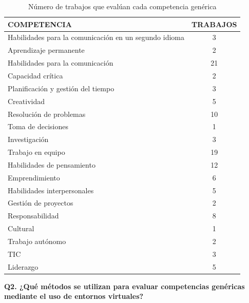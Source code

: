 
\begin{table}
  \begin{center}
  \begin{tabular}{| m{10cm} | c |}
    \hline
    COMPETENCIA & TRABAJOS\\
    \hline
    \hline 
    Habilidades para la comunicación en un segundo idioma & 3\\
    \hline
    Aprendizaje permanente & 2\\
    \hline
    Habilidades para la comunicación & 21\\
    \hline
    Capacidad crítica & 2\\
    \hline
    Planificación y gestión del tiempo & 3\\
    \hline
    Creatividad & 5\\
    \hline
    Resolución de problemas & 10\\
    \hline
    Toma de decisiones & 1\\
    \hline
    Investigación & 3\\
    \hline
    Trabajo en equipo & 19\\
    \hline
    Habilidades de pensamiento & 12\\
    \hline
    Emprendimiento & 6\\
    \hline
    Habilidades interpersonales & 5\\
    \hline
    Gestión de proyectos & 2\\
    \hline
    Responsabilidad & 8\\
    \hline
    Cultural & 1\\
    \hline
    Trabajo autónomo & 2\\
    \hline
    TIC & 3\\
    \hline
    Liderazgo & 5\\
    \hline
  \end{tabular}
\end{center}
\caption{Número de trabajos que evalúan cada competencia genérica}
\label{tab:TrabajosCompetencia}
\end{table} 

\bigskip
\textbf{Q2. ¿Qué métodos se utilizan para evaluar competencias genéricas mediante el uso de entornos virtuales?}

